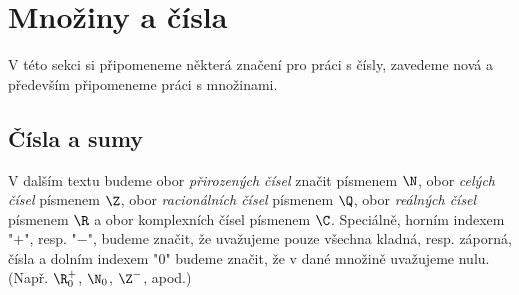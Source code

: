 \section{Množiny a čísla}\label{sec:mnoziny_a_cisla}

V této sekci si připomeneme některá značení pro práci s čísly, zavedeme nová a především připomeneme práci s množinami.

\subsection{Čísla a sumy}

\begin{convention}
    V dalším textu budeme obor \emph{přirozených čísel} značit písmenem $\N$, obor \emph{celých čísel} písmenem $\Z$, obor \emph{racionálních čísel} písmenem $\Q$, obor \emph{reálných čísel} písmenem $\R$ a obor komplexních čísel písmenem $\C$. Speciálně, horním indexem "$+$", resp. "$-$", budeme značit, že uvažujeme pouze všechna kladná, resp. záporná, čísla a dolním indexem "$0$" budeme značit, že v dané množině uvažujeme nulu. (Např. $\R_0^+$, $\N_0$, $\Z^-$, apod.) 
\end{convention}

